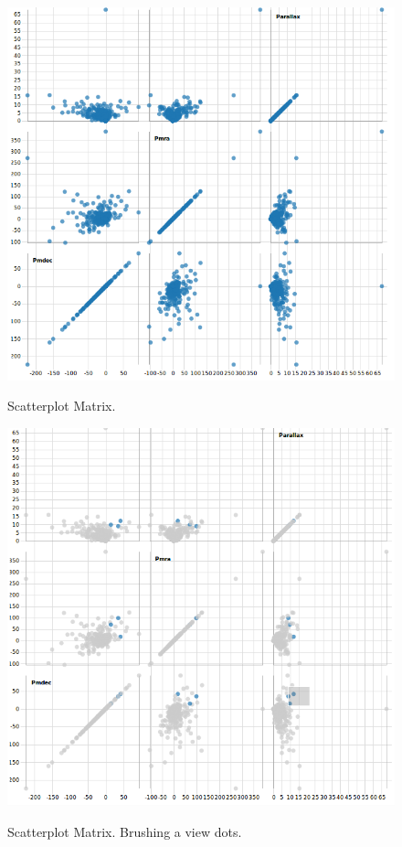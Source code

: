 \documentclass{article}
\begin{document}
\begin{figure}[!h]
\centering
\includegraphics[width=1\textwidth]{images/m3/scattermatrix.png}
\label{fig7}
\caption{Scatterplot Matrix.}
\end{figure}
\newpage
\begin{figure}[!h]
\centering
\includegraphics[width=1\textwidth]{images/m3/scattermatrix_brush.png}
\label{fig8}
\caption{Scatterplot Matrix. Brushing a view dots.}
\end{figure}
\newpage
\end{document}
